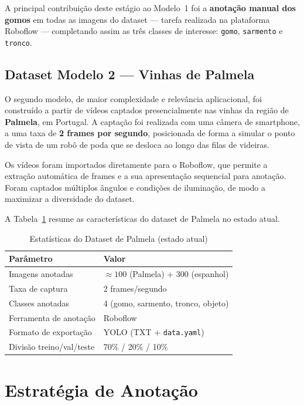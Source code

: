 A principal contribuição deste estágio ao Modelo~1 foi a \textbf{anotação
manual dos gomos} em todas as imagens do dataset — tarefa realizada na
plataforma Roboflow — completando assim as três classes de interesse:
\texttt{gomo}, \texttt{sarmento} e \texttt{tronco}.

\subsection{Dataset Modelo 2 — Vinhas de Palmela}
\label{sec:dataset_palmela}

O segundo modelo, de maior complexidade e relevância aplicacional, foi
construído a partir de vídeos captados presencialmente nas vinhas da região
de \textbf{Palmela}, em Portugal. A captação foi realizada com uma câmera
de smartphone, a uma taxa de \textbf{2 frames por segundo}, posicionada de
forma a simular o ponto de vista de um robô de poda que se desloca ao longo
das filas de videiras.

Os vídeos foram importados diretamente para o Roboflow, que permite a
extração automática de frames e a sua apresentação sequencial para anotação.
Foram captados múltiplos ângulos e condições de iluminação, de modo a
maximizar a diversidade do dataset.

A Tabela~\ref{tab:dataset_stats} resume as características do dataset de
Palmela no estado atual.

\begin{table}[H]
  \centering
  \caption{Estatísticas do Dataset de Palmela (estado atual)}
  \label{tab:dataset_stats}
  \begin{tabularx}{0.85\textwidth}{lX}
    \toprule
    \textbf{Parâmetro}         & \textbf{Valor} \\
    \midrule
    Imagens anotadas           & $\approx 100$ (Palmela) + 300 (espanhol) \\
    Taxa de captura            & 2 frames/segundo \\
    Classes anotadas           & 4 (gomo, sarmento, tronco, objeto) \\
    Ferramenta de anotação     & Roboflow \\
    Formato de exportação      & YOLO (TXT + \texttt{data.yaml}) \\
    Divisão treino/val/teste   & 70\% / 20\% / 10\% \\
    \bottomrule
  \end{tabularx}
\end{table}

\section{Estratégia de Anotação}
\label{sec:anotacao}

